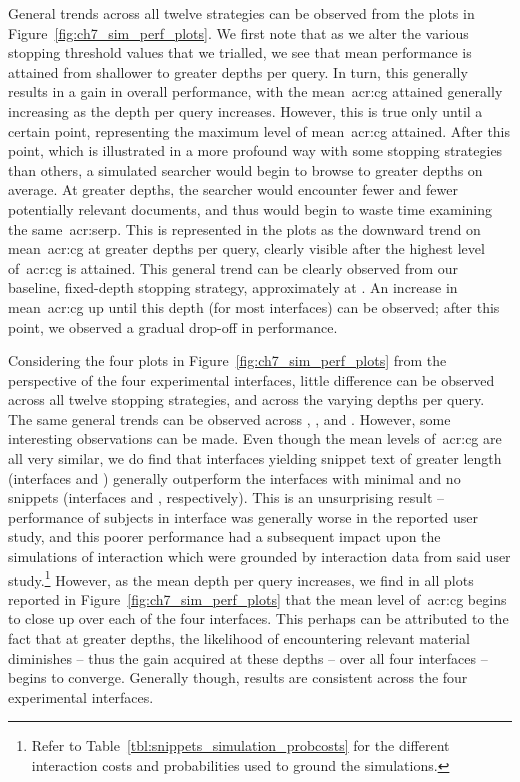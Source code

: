 General trends across all twelve strategies can be observed from the plots in Figure~\ref{fig:ch7_sim_perf_plots}. We first note that as we alter the various stopping threshold values that we trialled, we see that mean performance is attained from shallower to greater depths per query. In turn, this generally results in a gain in overall performance, with the mean~\gls{acr:cg} attained generally increasing as the depth per query increases. However, this is true only until a certain point, representing the maximum level of mean~\gls{acr:cg} attained. After this point, which is illustrated in a more profound way with some stopping strategies than others, a simulated searcher would begin to browse to greater depths on average. At greater depths, the searcher would encounter fewer and fewer potentially relevant documents, and thus would begin to waste time examining the same~\gls{acr:serp}. This is represented in the plots as the downward trend on mean~\gls{acr:cg} at greater depths per query, clearly visible after the highest level of~\gls{acr:cg} is attained. This general trend can be clearly observed from our baseline, fixed-depth stopping strategy, approximately at . An increase in mean~\gls{acr:cg} up until this depth (for most interfaces) can be observed; after this point, we observed a gradual drop-off in performance.

Considering the four plots in Figure~\ref{fig:ch7_sim_perf_plots} from the perspective of the four experimental interfaces, little difference can be observed across all twelve stopping strategies, and across the varying depths per query. The same general trends can be observed across , ,  and . However, some interesting observations can be made. Even though the mean levels of~\gls{acr:cg} are all very similar, we do find that interfaces yielding snippet text of greater length (interfaces  and ) generally outperform the interfaces with minimal and no snippets (interfaces  and , respectively). This is an unsurprising result -- performance of subjects in interface  was generally worse in the reported user study, and this poorer performance had a subsequent impact upon the simulations of interaction which were grounded by interaction data from said user study.\footnote{Refer to Table~\ref{tbl:snippets_simulation_probcosts} for the different interaction costs and probabilities used to ground the simulations.} However, as the mean depth per query increases, we find in all plots reported in Figure~\ref{fig:ch7_sim_perf_plots} that the mean level of~\gls{acr:cg} begins to close up over each of the four interfaces. This perhaps can be attributed to the fact that at greater depths, the likelihood of encountering relevant material diminishes -- thus the gain acquired at these depths -- over all four interfaces -- begins to converge. Generally though, results are consistent across the four experimental interfaces.

